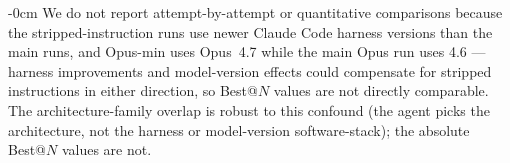 \documentclass[universe,article,submit,pdftex,oneauthor]{Definitions/mdpi}
\begin{document}
\begin{adjustwidth}{-\extralength}{0cm}
We do not report attempt-by-attempt or quantitative comparisons because the stripped-instruction runs use newer Claude Code harness versions than the main runs, and Opus-min uses Opus~4.7 while the main Opus run uses 4.6 --- harness improvements and model-version effects could compensate for stripped instructions in either direction, so Best@$N$ values are not directly comparable. The architecture-family overlap is robust to this confound (the agent picks the architecture, not the harness or model-version software-stack); the absolute Best@$N$ values are not.

\PublishersNote{}
\end{adjustwidth}
\end{document}
